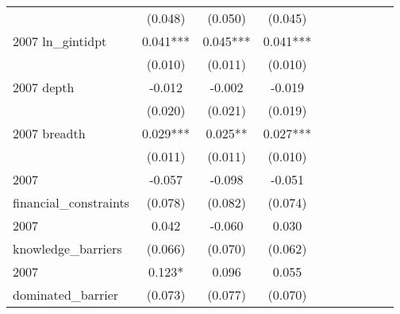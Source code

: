 \begin{table}[htbp]
\begin{tabular}{l*{9}{c}}
                    &     (0.048)   &     (0.050)   &     (0.045)   &               &               &               &               &               &               \\
2007 ln\_gintidpt    &       0.041***&       0.045***&       0.041***&               &               &               &               &               &               \\
                    &     (0.010)   &     (0.011)   &     (0.010)   &               &               &               &               &               &               \\
2007 depth          &      -0.012   &      -0.002   &      -0.019   &               &               &               &               &               &               \\
                    &     (0.020)   &     (0.021)   &     (0.019)   &               &               &               &               &               &               \\
2007 breadth        &       0.029***&       0.025** &       0.027***&               &               &               &               &               &               \\
                    &     (0.011)   &     (0.011)   &     (0.010)   &               &               &               &               &               &               \\
2007                &      -0.057   &      -0.098   &      -0.051   &               &               &               &               &               &               \\
financial\_constraints&     (0.078)   &     (0.082)   &     (0.074)   &               &               &               &               &               &               \\
2007                &       0.042   &      -0.060   &       0.030   &               &               &               &               &               &               \\
knowledge\_barriers  &     (0.066)   &     (0.070)   &     (0.062)   &               &               &               &               &               &               \\
2007                &       0.123*  &       0.096   &       0.055   &               &               &               &               &               &               \\
dominated\_barrier   &     (0.073)   &     (0.077)   &     (0.070)   &               &               &               &               &               &               \\

\end{tabular}
\end{table}
